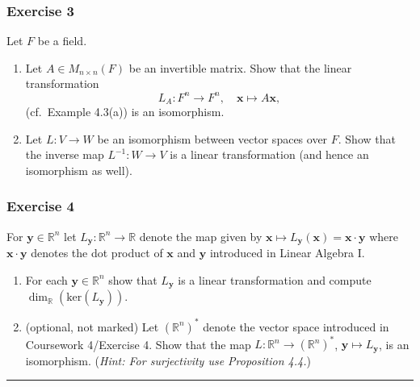 \documentclass[
  12pt,
  a4paper,
  twoside]{article}
\theoremstyle{plain}
\theoremstyle{definition}
\begin{document}
\hypertarget{exercise-3-6}{%
\subsubsection*{Exercise 3}\label{exercise-3-6}}

Let \(F\) be a field.

\begin{enumerate}
\def\labelenumi{(\alph{enumi})}
\item
  Let \(A \in M_{n \times n}(F)\) be an invertible matrix. Show
  that the linear transformation
  \[L_A: F^n \rightarrow F^n, \quad \mathbf{x} \mapsto A\mathbf{x},\]
  (cf.~Example 4.3(a)) is an isomorphism.
\item
  Let \(L: V \rightarrow W\) be an isomorphism between vector
  spaces over \(F\). Show that the inverse map \(L^{-1}:W \rightarrow V\) is a linear transformation (and hence an isomorphism as well).
\end{enumerate}

\hypertarget{exercise-4-4}{%
\subsubsection*{Exercise 4}\label{exercise-4-4}}

For \(\mathbf{y} \in \mathbb{R}^n\) let \(L_{\mathbf{y}}: \mathbb{R}^n \to \mathbb{R}\) denote
the map given by \(\mathbf{x} \mapsto L_{\mathbf{y}}(\mathbf{x}) = \mathbf{x} \cdot \mathbf{y}\) where \(\mathbf{x} \cdot \mathbf{y}\) denotes the dot
product of \(\mathbf{x}\) and \(\mathbf{y}\) introduced in Linear Algebra I.

\begin{enumerate}
\def\labelenumi{(\alph{enumi})}
\item
  For each \(\mathbf{y} \in \mathbb{R}^n\) show that \(L_\mathbf{y}\) is a linear
  transformation and compute \(\dim_{\mathbb{R}}(\textrm{ker}(L_\mathbf{y}))\).
\item
  (optional, not marked) Let \((\mathbb{R}^n)^*\) denote the vector space introduced in
  Coursework 4/Exercise 4. Show that the map \(L: \mathbb{R}^n \to (\mathbb{R}^n)^*\), \(\mathbf{y} \mapsto L_\mathbf{y}\), is an isomorphism.
  (\emph{Hint: For surjectivity use Proposition 4.4.})
\end{enumerate}

\begin{center}\rule{0.5\linewidth}{0.5pt}\end{center}
\end{document}
